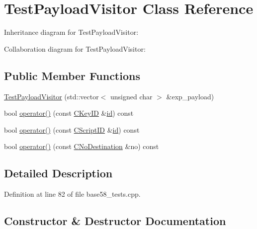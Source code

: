 \hypertarget{class_test_payload_visitor}{}\section{Test\+Payload\+Visitor Class Reference}
\label{class_test_payload_visitor}


Inheritance diagram for Test\+Payload\+Visitor\+:


Collaboration diagram for Test\+Payload\+Visitor\+:
\subsection*{Public Member Functions}
\begin{DoxyCompactItemize}
\item 
\hyperlink{class_test_payload_visitor_a8f963dfce22edb3c83c5712f4a9fa64d}{Test\+Payload\+Visitor} (std\+::vector$<$ unsigned char $>$ \&exp\+\_\+payload)
\item 
bool \hyperlink{class_test_payload_visitor_a696edf0b12cc446b448ab676dfc6fc78}{operator()} (const \hyperlink{class_c_key_i_d}{C\+Key\+I\+D} \&\hyperlink{db__test_8cc_a7441ef0865bcb3db9b8064dd7375c1ea}{id}) const 
\item 
bool \hyperlink{class_test_payload_visitor_a8ff11d72e4866f6ae023e3ce23830454}{operator()} (const \hyperlink{class_c_script_i_d}{C\+Script\+I\+D} \&\hyperlink{db__test_8cc_a7441ef0865bcb3db9b8064dd7375c1ea}{id}) const 
\item 
bool \hyperlink{class_test_payload_visitor_ae7023a445384bfb2602f5fbdb6bba932}{operator()} (const \hyperlink{class_c_no_destination}{C\+No\+Destination} \&no) const 
\end{DoxyCompactItemize}


\subsection{Detailed Description}


Definition at line 82 of file base58\+\_\+tests.\+cpp.



\subsection{Constructor \& Destructor Documentation}
\hypertarget{class_test_payload_visitor_a8f963dfce22edb3c83c5712f4a9fa64d}{}
